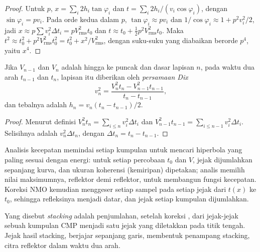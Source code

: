 \begin{proof}
Untuk  $p$, $x = \sum_i 2h_i\tan\varphi_i$ dan
$t = \sum_i 2h_i/(v_i\cos\varphi_i)$, dengan $\sin\varphi_i = pv_i$. Pada orde kedua
dalam $p$, $\tan\varphi_i \approx pv_i$ dan $1/\cos\varphi_i \approx 1 +
p^2v_i^2/2$, jadi $x \approx p\sum v_i^2\Delta t_i = pV_{\text{rms}}^2t_0$ dan
$t \approx t_0 + \tfrac12p^2V_{\text{rms}}^2t_0$. Maka
$t^2 \approx t_0^2 + p^2V_{\text{rms}}^2t_0^2 = t_0^2 + x^2/V_{\text{rms}}^2$, dengan
suku-suku yang diabaikan berorde $p^4$, yaitu $x^4$.
\end{proof}

\begin{theorem}\label{thm:b3:exploration-seismology:dix}
Jika $V_{n-1}$ dan $V_n$ adalah  hingga ke puncak dan dasar lapisan
$n$, pada waktu dua arah $t_{n-1}$ dan $t_n$, 
lapisan itu diberikan oleh \emph{persamaan Dix}
\[
  v_n^2 = \frac{V_n^2t_n - V_{n-1}^2t_{n-1}}{t_n - t_{n-1}} ,
\]
dan tebalnya adalah $h_n = v_n(t_n - t_{n-1})/2$.
\end{theorem}

\begin{proof}
Menurut definisi $V_n^2t_n = \sum_{i\le n}v_i^2\Delta t_i$ dan $V_{n-1}^2t_{n-1}
= \sum_{i\le n-1}v_i^2\Delta t_i$. Selisihnya adalah $v_n^2\Delta t_n$, dengan
$\Delta t_n = t_n - t_{n-1}$.
\end{proof}

Analisis kecepatan memindai setiap kumpulan untuk mencari hiperbola yang paling sesuai dengan
energi: untuk setiap percobaan $t_0$ dan $V$, jejak dijumlahkan sepanjang kurva, dan
ukuran koherensi (kemiripan) dipetakan; analis memilih nilai maksimumnya,
reflektor demi reflektor, untuk membangun fungsi kecepatan. Koreksi NMO kemudian
menggeser setiap sampel pada setiap jejak dari $t(x)$ ke $t_0$, sehingga refleksinya
menjadi datar, dan jejak setiap kumpulan dijumlahkan.

\begin{definition}[Stacking]\label{def:b3:exploration-seismology:stack}
Yang disebut \emph{stacking} adalah penjumlahan, setelah
koreksi , dari jejak-jejak sebuah kumpulan CMP menjadi satu jejak
yang diletakkan pada titik tengah. Jejak hasil stacking, berjajar sepanjang garis, membentuk
penampang stacking, citra reflektor dalam waktu dua arah.
\end{definition}

